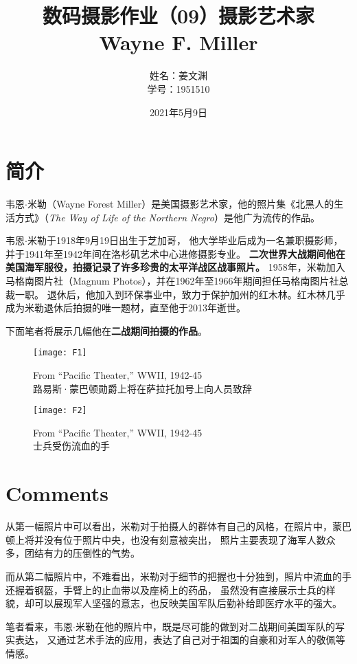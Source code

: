 \documentclass[cn,black,10pt,normal]{elegantnote}
\title{数码摄影作业（09）摄影艺术家\\\small{Wayne F. Miller}}
\author{姓名：姜文渊\\学号：1951510}
\date{2021年5月9日}
\begin{document}
\maketitle


\section{简介}

韦恩$\cdot$米勒（Wayne Forest Miller）是美国摄影艺术家，他的照片集《北黑人的生活方式》（\textit{The Way of Life of the Northern Negro}）是他广为流传的作品。\cite{wiki:Wayne_F._Miller} 

韦恩$\cdot$米勒于1918年9月19日出生于芝加哥，
他大学毕业后成为一名兼职摄影师，并于1941年至1942年间在洛杉矶艺术中心进修摄影专业。
\textbf{二次世界大战期间他在美国海军服役，拍摄记录了许多珍贵的太平洋战区战事照片。}
1958年，米勒加入马格南图片社（Magnum Photos），并在1962年至1966年期间担任马格南图片社总裁一职。
退休后，他加入到环保事业中，致力于保护加州的红木林。红木林几乎成为米勒退休后拍摄的唯一题材，直至他于2013年逝世。

下面笔者将展示几幅他在\textbf{二战期间拍摄的作品}。
\begin{figure}[H]
    \centering
    \texttt{[image: F1]}
    \caption{From “Pacific Theater,” WWII, 1942-45 \\ 路易斯·蒙巴顿勋爵上将在萨拉托加号上向人员致辞}
    \label{F-02}
\end{figure}

\begin{figure}[H]
    \centering
    \texttt{[image: F2]}
    \caption{From “Pacific Theater,” WWII, 1942-45 \\ 士兵受伤流血的手}
    \label{F-01}
\end{figure}

\section{Comments}
从第一幅照片中可以看出，米勒对于拍摄人的群体有自己的风格，在照片中，蒙巴顿上将并没有位于照片中央，也没有刻意被突出，
照片主要表现了海军人数众多，团结有力的压倒性的气势。

而从第二幅照片中，不难看出，米勒对于细节的把握也十分独到，照片中流血的手还握着钢盔，手臂上的止血带以及座椅上的药品，
虽然没有直接展示士兵的样貌，却可以展现军人坚强的意志，也反映美国军队后勤补给即医疗水平的强大。

笔者看来，韦恩$\cdot$米勒在他的照片中，既是尽可能的做到对二战期间美国军队的写实表达，
又通过艺术手法的应用，表达了自己对于祖国的自豪和对军人的敬佩等情感。

{}
\end{document}
